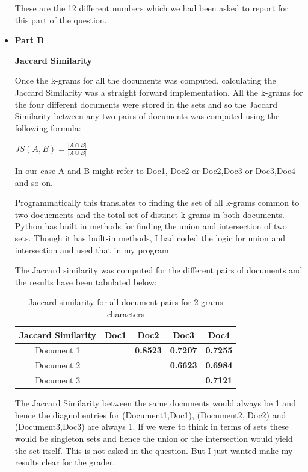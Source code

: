 \documentclass[11pt]{article}
\begin{document}
\begin{itemize}
	These are the 12 different numbers which we had been asked to report for this part of the question.
	
	\item[] \textbf{Part B}
	
	\textbf{ Jaccard Similarity}
	
	Once the k-grams for all the documents was computed, calculating the Jaccard Similarity was a straight forward implementation. All the k-grams for the four different documents were stored in the sets and so the Jaccard Similarity between any two pairs of documents was computed using the following formula:
	\begin{center}
	$JS(A,B)=\frac{| A \cap  B|}{|A \cup B|}$
	\end{center}

	

	In our case A and B might refer to Doc1, Doc2 or Doc2,Doc3 or Doc3,Doc4 and so on. 
	
	Programmatically this translates to finding the set of all k-grams common to two docuements and the total set of distinct k-grams in both documents. Python has built in methods for finding the union and intersection of two sets. Though it has  built-in methods, I had coded the logic for union and intersection and used that in my program.
	
	
	The Jaccard similarity was computed for the different pairs of documents and the results have been tabulated below:


	\begin{table}[h]
		\centering
		\begin{tabular}{|c|c|c|c|c|}
			\hline
			\textbf{Jaccard Similarity}  & \textbf{Doc1} & \textbf{Doc2} & \textbf{Doc3} & \textbf{Doc4}  \\
			\hline
			Document 1&    &  \textbf{0.8523}   &  \textbf{0.7207}     &  \textbf{0.7255}  \\
			\hline
			Document 2 &      &      &  \textbf{0.6623}    &  \textbf{0.6984}    \\
			\hline
			Document 3 &      &     &     &  \textbf{0.7121}    \\
			\hline
		\end{tabular}
		\caption{Jaccard similarity for all document pairs for 2-grams characters}
		\label{t2}
	\end{table}
	
	The Jaccard Similarity between the same documents would always be 1 and hence the diagnol entries for (Document1,Doc1), (Document2, Doc2) and (Document3,Doc3) are always 1. If we were to think in terms of sets these would be singleton sets and hence the union or the intersection would yield the set itself. This is not asked in the question. But I just wanted make my results clear for the grader. 
	

\end{itemize}
\end{document}
